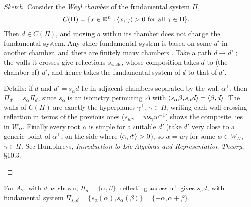 \begin{proof}[Sketch]
Consider the \emph{Weyl chamber} of the fundamental system $\Pi$,
\[
  C(\Pi)=\{x\in\mathbb{R}^n : \langle x, \gamma\rangle>0 \text{ for all }\gamma\in\Pi\}.
\]
Then $d\in C(\Pi)$, and moving $d$ within its chamber does not change the fundamental system.
Any other fundamental system is based on some $d'$ in another chamber, and there are finitely many
chambers . Take a path
$d\to d'$ ; the walls it crosses give reflections $s_{\text{walls}}$, whose
composition takes $d$ to (the chamber of) $d'$, and hence takes the fundamental system of $d$ to that
of $d'$.
\begin{addedblock}
Details: if $d$ and $d'=s_\alpha d$ lie in adjacent chambers separated by the wall $\alpha^\perp$,
then $\Pi_{d'}=s_\alpha\Pi_d$, since $s_\alpha$ is an isometry permuting $\Delta$ with
$\langle s_\alpha\beta, s_\alpha d\rangle=\langle \beta, d\rangle$. The walls of $C(\Pi)$ are exactly the hyperplanes
$\gamma^\perp$, $\gamma\in\Pi$; writing each wall-crossing reflection in terms of the previous ones
($s_{w\gamma}=ws_\gamma w^{-1}$) shows the composite lies in $W_\Pi$. Finally every root $\alpha$ is
simple for a suitable $d'$ (take $d'$ very close to a generic point of $\alpha^\perp$, on the side where
$\langle \alpha, d'\rangle>0$), so $\alpha=w\gamma$ for some $w\in W_\Pi$, $\gamma\in\Pi$. See Humphreys,
\emph{Introduction to Lie Algebras and Representation Theory}, \S10.3.
\end{addedblock}
\end{proof}

\begin{center}
\end{center}
For $A_2$: with $d$ as shown, $\Pi_d=\{\alpha,\beta\}$; reflecting across $\alpha^\perp$ gives
$s_\alpha d$, with fundamental system $\Pi_{s_\alpha d}=\{s_\alpha(\alpha),s_\alpha(\beta)\}=\{-\alpha,\alpha+\beta\}$.

